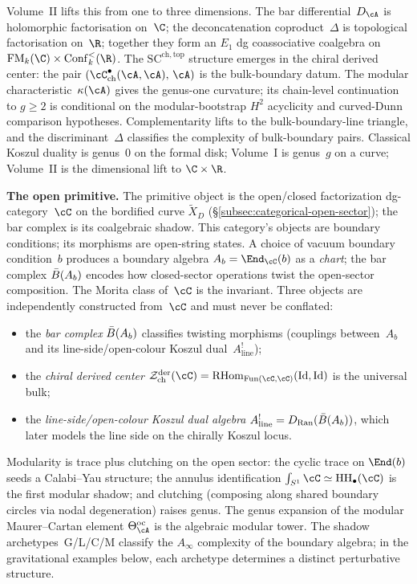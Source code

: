 Volume~II lifts this from one to three dimensions. The bar differential~$D_\cA$ is holomorphic factorisation on~$\C$; the deconcatenation coproduct~$\Delta$ is topological factorisation on~$\R$; together they form an $E_1$ dg coassociative coalgebra on $\FM_k(\C) \times \Conf_k^<(\R)$. The $\mathrm{SC}^{\mathrm{ch,top}}$ structure emerges in the chiral derived center: the pair $(\cC^\bullet_{\mathrm{ch}}(\cA,\cA),\,\cA)$ is the bulk-boundary datum. The modular characteristic~$\kappa(\cA)$ gives the genus-one curvature; its chain-level continuation to $g \ge 2$ is conditional on the modular-bootstrap $H^2$ acyclicity and curved-Dunn comparison hypotheses. Complementarity lifts to the bulk-boundary-line triangle, and the discriminant~$\Delta$ classifies the complexity of bulk-boundary pairs. Classical Koszul duality is genus~$0$ on the formal disk; Volume~I is genus~$g$ on a curve; Volume~II is the dimensional lift to $\C \times \R$.

\medskip
\noindent\textbf{The open primitive.}\enspace
The primitive object is the open/closed factorization dg-category~$\cC$
on the bordified curve $\widetilde{X}_D$
(\S\ref{subsec:categorical-open-sector}); the bar complex is its
coalgebraic shadow. This category's objects are boundary conditions;
its morphisms are open-string states. A choice of vacuum boundary
condition~$b$ produces a boundary algebra $A_b = \End_\cC(b)$ as a
\emph{chart}; the bar complex $\bar{B}(A_b)$ encodes how closed-sector
operations twist the open-sector composition. The Morita class
of~$\cC$ is the invariant. Three objects are independently constructed
from~$\cC$ and must never be conflated:
\begin{itemize}[nosep]
\item the \emph{bar complex} $\bar{B}(A_b)$ classifies twisting morphisms (couplings between~$A_b$ and its line-side/open-colour Koszul dual~$A^!_{\mathrm{line}}$);
\item the \emph{chiral derived center} $\cZ^{\mathrm{der}}_{\mathrm{ch}}(\cC) = \RHom_{\operatorname{Fun}(\cC,\cC)}(\operatorname{Id}, \operatorname{Id})$ is the universal bulk;
\item the \emph{line-side/open-colour Koszul dual algebra} $A^!_{\mathrm{line}} = D_{\operatorname{Ran}}(\bar{B}(A_b))$, which later models the line side on the chirally Koszul locus.
\end{itemize}
Modularity is trace plus clutching on the open sector: the cyclic
trace on $\End(b)$ seeds a Calabi--Yau structure; the annulus
identification $\int_{S^1} \cC \simeq \HH_\bullet(\cC)$ is the first
modular shadow; and clutching (composing along shared boundary circles
via nodal degeneration) raises genus. The genus expansion of the
modular Maurer--Cartan element $\Theta^{\mathrm{oc}}_\cA$ is the
algebraic modular tower. The shadow archetypes~G/L/C/M classify the
$A_\infty$ complexity of the boundary algebra; in the gravitational
examples below, each archetype determines a distinct perturbative
structure.

